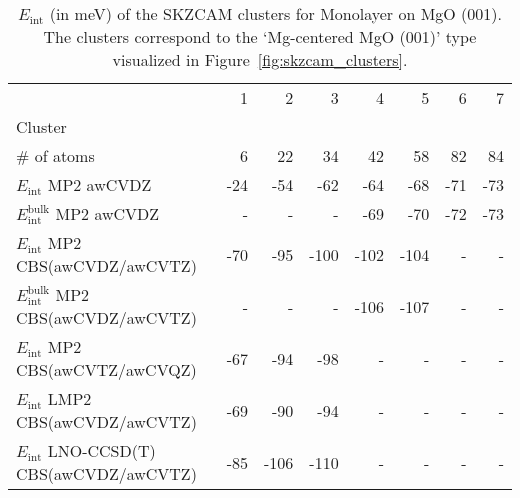 \begin{table}
\caption{\label{tab:system_eint_mgo_ch4_monolayer}$E_\textrm{int}$ (in meV) of the SKZCAM clusters for Monolayer  on MgO (001). The clusters correspond to the `Mg-centered MgO (001)' type visualized in Figure~\ref{fig:skzcam_clusters}.}
\begin{adjustbox}{center,max width=1.4\textwidth}
\begin{tabular}{lrrrrrrr}
\toprule
 & 1 & 2 & 3 & 4 & 5 & 6 & 7 \\ 
Cluster &  &  &  &  &  &  &  \\
\midrule
\# of atoms & 6 & 22 & 34 & 42 & 58 & 82 & 84 \\
$E_\textrm{int}$ MP2 awCVDZ & -24 & -54 & -62 & -64 & -68 & -71 & -73 \\
$E_\textrm{int}^\textrm{bulk}$ MP2 awCVDZ & - & - & - & -69 & -70 & -72 & -73 \\
$E_\textrm{int}$ MP2 CBS(awCVDZ/awCVTZ) & -70 & -95 & -100 & -102 & -104 & - & - \\
$E_\textrm{int}^\textrm{bulk}$ MP2 CBS(awCVDZ/awCVTZ) & - & - & - & -106 & -107 & - & - \\
$E_\textrm{int}$ MP2 CBS(awCVTZ/awCVQZ) & -67 & -94 & -98 & - & - & - & - \\
$E_\textrm{int}$ LMP2 CBS(awCVDZ/awCVTZ) & -69 & -90 & -94 & - & - & - & - \\
$E_\textrm{int}$ LNO-CCSD(T) CBS(awCVDZ/awCVTZ) & -85 & -106 & -110 & - & - & - & - \\
\bottomrule
\end{tabular}
\end{adjustbox}
\end{table}

